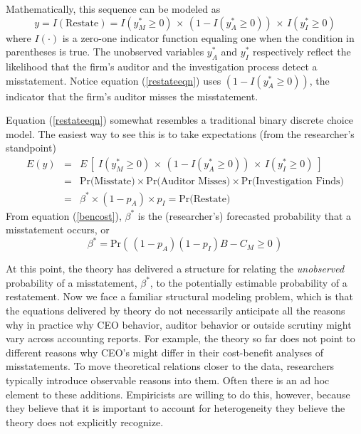 Mathematically, this sequence can be modeled as
\begin{equation}\label{restateeqn}
 y = I(\mbox{Restate}) = I(y^*_M \ge 0) \, \times\, (1 - I(y^*_A \ge 0)) \, \times\, I(y^*_I \ge 0)
\end{equation}
where $I(\cdot)$ is a zero-one indicator function equaling one when the condition in parentheses is true.
The unobserved variables $y^*_A$ and $y^*_I$ respectively reflect the likelihood that the firm's
auditor and the investigation process detect a misstatement. Notice equation (\ref{restateeqn})
uses $(1 - I(y^*_A \ge 0))$, the indicator that the firm's auditor misses the misstatement.

Equation (\ref{restateeqn}) somewhat resembles a traditional binary discrete choice model. The easiest
way to see this is to take expectations (from the researcher's standpoint)
\begin{equation} \label{equilpr}
\begin{array}{lcl}
 E(y) & = & E\, \left[\; I(y^*_M \ge 0) \, \times\, (1 - I(y^*_A \ge 0)) \, \times\, I(y^*_I \ge 0) \; \right]\\[1em]
 & = &  \mbox{Pr(Misstate)} \times \mbox{Pr(Auditor Misses)} \times
\mbox{Pr(Investigation Finds)}\\[1em]
& = & \beta^* \times (1-p_A) \times p_{I} = \mbox{Pr(Restate)}
\end{array}\end{equation}
From equation (\ref{bencost}), $\beta^*$ is the (researcher's) forecasted probability that a misstatement occurs, or
\begin{equation}\label{betaplus}
\beta^*= \mbox{Pr}\left(\, (1 - p_A)(1 - p_I) B - C_M \ge 0 \,\right)
\end{equation}

At this point, the theory has delivered a structure for relating the \emph{unobserved} probability of a misstatement, $\beta^*$, to the potentially estimable probability of a restatement.
Now we face a familiar structural modeling problem, which is that the equations delivered by theory do not necessarily anticipate all the reasons why in practice why CEO behavior, auditor behavior or outside scrutiny might vary across accounting reports.
For example, the theory so far does not point to different reasons why CEO's might differ in their cost-benefit analyses of misstatements. 
To move theoretical relations closer to the data, researchers typically introduce observable reasons into them. 
Often there is an ad hoc element to these additions. 
Empiricists are willing to do this, however, because they believe that it is important to account for heterogeneity they believe the theory does not explicitly recognize.

